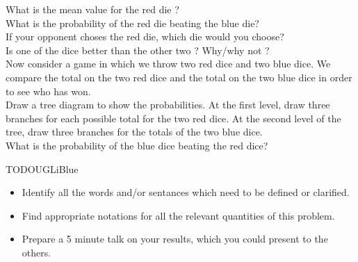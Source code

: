 \documentclass[12pt,a4paper]{nsiarticle}
\begin{document}
\question What is the mean value for the red die ?\\

\question What is the probability of the red die beating the blue die?\\

\question If your opponent choses the red die, which die would you choose?\\

\question Is one of the dice better than the other two ? Why/why not ?\\

\question Now consider a game in which we throw two red dice and two blue dice. We compare the total on the
two red dice and the total on the two blue dice in order to see who has won.\\
Draw a tree diagram to show the probabilities. At the first level, draw three branches for each possible total for the two red dice. At the second level of the tree, draw three branches for the totals of the two blue dice.\\

What is the probability of the blue dice beating the red dice? 

\begin{encadrecolore}{TODO}{UGLiBlue}
    \begin{itemize}
        \item Identify all the words and/or sentances which need to be defined or clarified.
        \item Find appropriate notations for all the relevant quantities of this problem.
        \item Prepare a 5 minute talk on your results, which you could present to the others.
    \end{itemize}
\end{encadrecolore}
\end{document}
